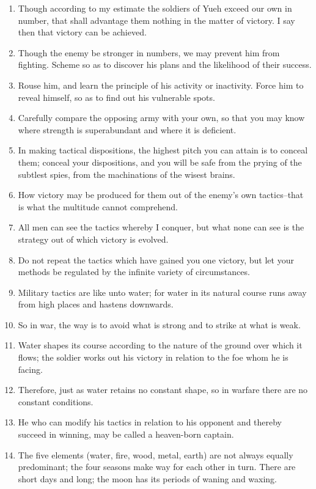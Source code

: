 \begin{enumerate}
  \item Though according to my estimate the soldiers of Yueh exceed
    our own in number, that shall advantage them nothing in the matter
    of victory. I say then that victory can be achieved.

  \item Though the enemy be stronger in numbers, we may prevent him
    from fighting. Scheme so as to discover his plans and the
    likelihood of their success.

  \item Rouse him, and learn the principle of his activity or
    inactivity. Force him to reveal himself, so as to find out his
    vulnerable spots.

  \item Carefully compare the opposing army with your own, so that you
    may know where strength is superabundant and where it is
    deficient.

  \item In making tactical dispositions, the highest pitch you can
    attain is to conceal them; conceal your dispositions, and you will
    be safe from the prying of the subtlest spies, from the
    machinations of the wisest brains.

  \item How victory may be produced for them out of the enemy's own
    tactics--that is what the multitude cannot comprehend.

  \item All men can see the tactics whereby I conquer, but what none
    can see is the strategy out of which victory is evolved.

  \item Do not repeat the tactics which have gained you one victory,
    but let your methods be regulated by the infinite variety of
    circumstances.

  \item Military tactics are like unto water; for water in its natural
    course runs away from high places and hastens downwards.

  \item So in war, the way is to avoid what is strong and to strike at
    what is weak.

  \item Water shapes its course according to the nature of the ground
    over which it flows; the soldier works out his victory in relation
    to the foe whom he is facing.

  \item Therefore, just as water retains no constant shape, so in
    warfare there are no constant conditions.

  \item He who can modify his tactics in relation to his opponent and
    thereby succeed in winning, may be called a heaven-born captain.

  \item The five elements (water, fire, wood, metal, earth) are not
    always equally predominant; the four seasons make way for each
    other in turn. There are short days and long; the moon has its
    periods of waning and waxing.

  \end{enumerate}
